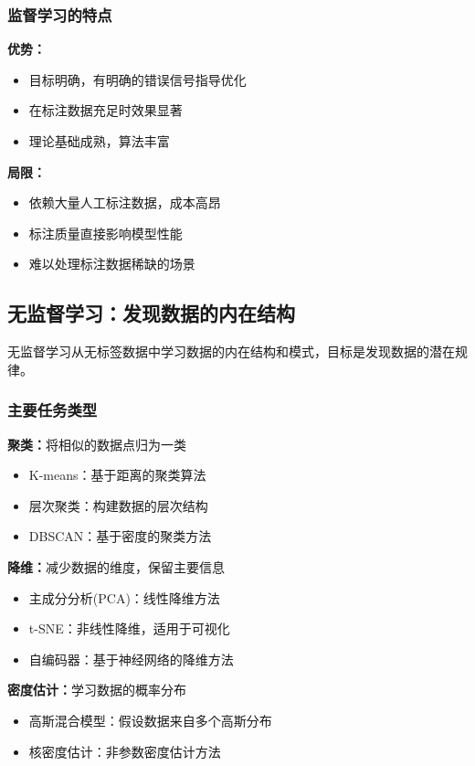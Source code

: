 \subsubsection{监督学习的特点}

\textbf{优势：}
\begin{itemize}
\item 目标明确，有明确的错误信号指导优化
\item 在标注数据充足时效果显著
\item 理论基础成熟，算法丰富
\end{itemize}

\textbf{局限：}
\begin{itemize}
\item 依赖大量人工标注数据，成本高昂
\item 标注质量直接影响模型性能
\item 难以处理标注数据稀缺的场景
\end{itemize}

\subsection{无监督学习：发现数据的内在结构}

无监督学习从无标签数据中学习数据的内在结构和模式，目标是发现数据的潜在规律。

\subsubsection{主要任务类型}

\textbf{聚类：}将相似的数据点归为一类
\begin{itemize}
\item K-means：基于距离的聚类算法
\item 层次聚类：构建数据的层次结构
\item DBSCAN：基于密度的聚类方法
\end{itemize}

\textbf{降维：}减少数据的维度，保留主要信息
\begin{itemize}
\item 主成分分析(PCA)：线性降维方法
\item t-SNE：非线性降维，适用于可视化
\item 自编码器：基于神经网络的降维方法
\end{itemize}

\textbf{密度估计：}学习数据的概率分布
\begin{itemize}
\item 高斯混合模型：假设数据来自多个高斯分布
\item 核密度估计：非参数密度估计方法
\end{itemize}

